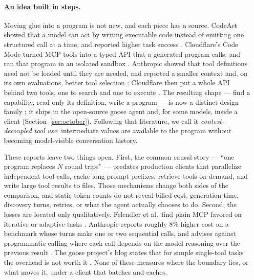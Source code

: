 \documentclass[10pt,twocolumn]{article}
\begin{document}
\paragraph{An idea built in steps.}
Moving glue into a program is not new, and each piece has a source.  CodeAct
showed that a model can act by writing executable code instead of emitting one
structured call at a time, and reported higher task success
\cite{wang2024codeact}.  Cloudflare's Code Mode turned MCP tools into a typed
API that a generated program calls, and ran that program in an isolated
sandbox \cite{cloudflare2025codemode}.  Anthropic showed that tool
definitions need not be loaded until they are needed, and reported a smaller
context \cite{anthropic2025advancedtools,anthropic2025codemcp} and, on its
own evaluations, better tool selection \cite{anthropic2025advancedtools};
Cloudflare then put a
whole API behind two tools, one to search and one to execute
\cite{cloudflare2026codemode}.  The resulting shape --- find a capability,
read only its definition, write a program --- is now a distinct design family
\cite{felendler2026mcp}; it ships in the open-source goose agent
\cite{goose2026codemode} and, for some models, inside a client
(Section~\ref{sec:october}).  Following that literature, we call it
\emph{context-decoupled tool use}: intermediate values are available to the
program without becoming model-visible conversation history.

These reports leave two things open.  First, the common causal story ---
``one program replaces $N$ round trips'' --- predates production clients that
parallelize independent tool calls, cache long prompt prefixes, retrieve tools
on demand, and write large tool results to files.  Those mechanisms change
both sides of the comparison, and static token counts do not reveal billed
cost, generation time, discovery turns, retries, or what the agent actually
chooses to do.  Second, the losses are located only qualitatively.
Felendler et al.\ find plain MCP favored on iterative or adaptive tasks
\cite{felendler2026mcp}.  Anthropic reports roughly 8\% higher cost on a
benchmark whose turns make one or two sequential calls, and advises against
programmatic calling where each call depends on the model reasoning over the
previous result \cite{anthropic2026ptc}.  The goose project's blog states
that for simple single-tool tasks the overhead is not worth it
\cite{goose2026codemode}.  None of these measures where the boundary lies, or
what moves it, under a client that batches and caches.
\end{document}
